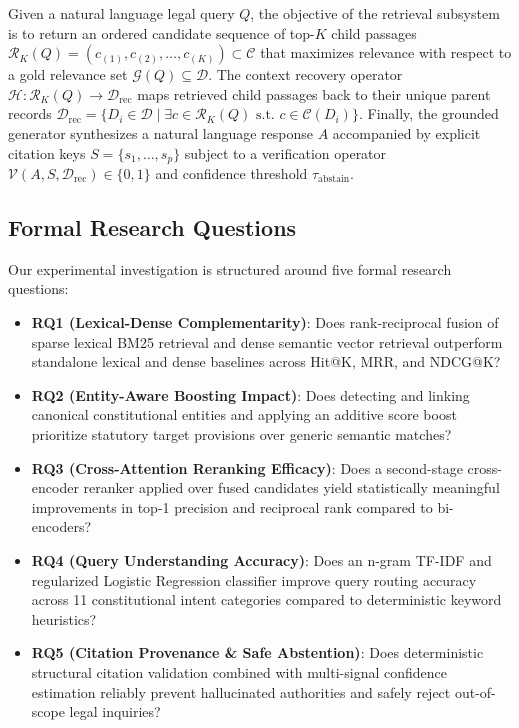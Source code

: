 \documentclass[10pt,twocolumn]{article}
\begin{document}
Given a natural language legal query $Q$, the objective of the retrieval subsystem is to return an ordered candidate sequence of top-$K$ child passages $\mathcal{R}_K(Q) = (c_{(1)}, c_{(2)}, \dots, c_{(K)}) \subset \mathcal{C}$ that maximizes relevance with respect to a gold relevance set $\mathcal{G}(Q) \subseteq \mathcal{D}$. The context recovery operator $\mathcal{H}: \mathcal{R}_K(Q) \to \mathcal{D}_{\text{rec}}$ maps retrieved child passages back to their unique parent records $\mathcal{D}_{\text{rec}} = \{D_i \in \mathcal{D} \mid \exists c \in \mathcal{R}_K(Q) \text{ s.t. } c \in \mathcal{C}(D_i)\}$. Finally, the grounded generator synthesizes a natural language response $A$ accompanied by explicit citation keys $S = \{s_1, \dots, s_p\}$ subject to a verification operator $\mathcal{V}(A, S, \mathcal{D}_{\text{rec}}) \in \{0, 1\}$ and confidence threshold $\tau_{\text{abstain}}$.

\subsection{Formal Research Questions}
Our experimental investigation is structured around five formal research questions:
\begin{itemize}[leftmargin=*]
    \item \textbf{RQ1 (Lexical-Dense Complementarity)}: Does rank-reciprocal fusion of sparse lexical BM25 retrieval and dense semantic vector retrieval outperform standalone lexical and dense baselines across Hit@K, MRR, and NDCG@K?
    \item \textbf{RQ2 (Entity-Aware Boosting Impact)}: Does detecting and linking canonical constitutional entities and applying an additive score boost prioritize statutory target provisions over generic semantic matches?
    \item \textbf{RQ3 (Cross-Attention Reranking Efficacy)}: Does a second-stage cross-encoder reranker applied over fused candidates yield statistically meaningful improvements in top-1 precision and reciprocal rank compared to bi-encoders?
    \item \textbf{RQ4 (Query Understanding Accuracy)}: Does an n-gram TF-IDF and regularized Logistic Regression classifier improve query routing accuracy across 11 constitutional intent categories compared to deterministic keyword heuristics?
    \item \textbf{RQ5 (Citation Provenance \& Safe Abstention)}: Does deterministic structural citation validation combined with multi-signal confidence estimation reliably prevent hallucinated authorities and safely reject out-of-scope legal inquiries?
\end{itemize}
\end{document}
